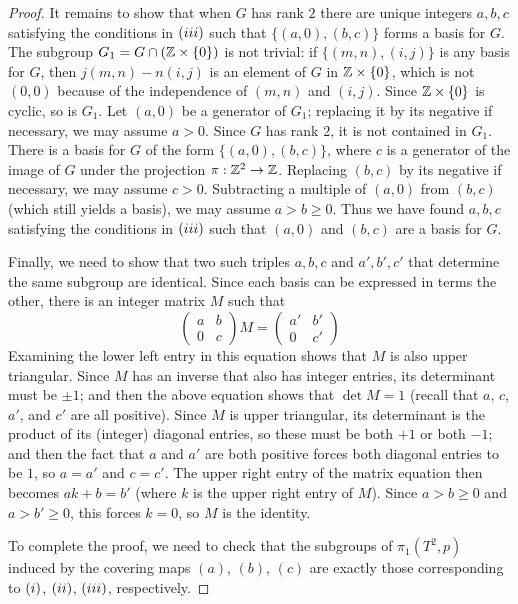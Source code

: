 \begin{proof}
It remains to show that when $G$ has rank $2$ there are unique integers $a,b,c$ satisfying the conditions in $(\rmnum{3})$ such that $\{(a,0),(b,c)\}$ forms a basis for $G$. The subgroup $G_1=G\cap(\mathbb{Z}\times\{0\})$ is not trivial: if $\{(m,n),(i,j)\}$ is any basis for $G$, then $j(m,n)-n(i,j)$ is an element of $G$ in $\mathbb{Z}\times\{0\}$, which is not $(0,0)$ because of the independence of $(m,n)$ and $(i,j)$. Since $\mathbb{Z}\times\{0\}$ is cyclic, so is $G_1$. Let $(a,0)$ be a generator of $G_1$; replacing it by its negative if necessary, we may assume $a>0$. Since $G$ has rank $2$, it is not contained in $G_1$. There is a basis for $G$ of the form $\{(a,0),(b,c)\}$, where $c$ is a generator of the image of $G$ under the projection $\pi:\mathbb{Z}^2\to\mathbb{Z}$. Replacing $(b,c)$ by its negative if necessary, we may assume $c>0$. Subtracting a multiple of $(a,0)$ from $(b,c)$ (which still yields a basis), we may assume $a>b\geq0$. Thus we have found $a,b,c$ satisfying the conditions in $(\rmnum{3})$ such that $(a,0)$ and $(b,c)$ are a basis for $G$.\par
Finally, we need to show that two such triples $a,b,c$ and $a',b',c'$ that determine the same subgroup are identical. Since each basis can be expressed in terms
the other, there is an integer matrix $M$ such that
\[\begin{pmatrix}
a&b\\0&c
\end{pmatrix}M=\begin{pmatrix}a'&b'\\0&c'
\end{pmatrix}\]
Examining the lower left entry in this equation shows that $M$ is also upper triangular. Since $M$ has an inverse that also has integer entries, its determinant must be $\pm1$; and then the above equation shows that $\det M=1$ (recall that $a$, $c$, $a'$, and $c'$ are all positive). Since $M$ is upper triangular, its determinant is the product of its (integer) diagonal entries, so these must be both $+1$ or both $-1$; and then the fact that $a$ and $a'$ are both positive forces both diagonal entries to be $1$, so $a=a'$ and $c=c'$. The upper right entry of the matrix equation then becomes $ak+b=b'$ (where $k$ is the upper right entry of $M$). Since $a>b\geq0$ and $a>b'\geq0$, this forces $k=0$, so $M$ is the identity.\par
To complete the proof, we need to check that the subgroups of $\pi_1(T^2,p)$ induced by the covering maps $(a)$, $(b)$, $(c)$ are exactly those corresponding to $(\rmnum{1})$, $(\rmnum{2})$, $(\rmnum{3})$, respectively.\par

\end{proof}
